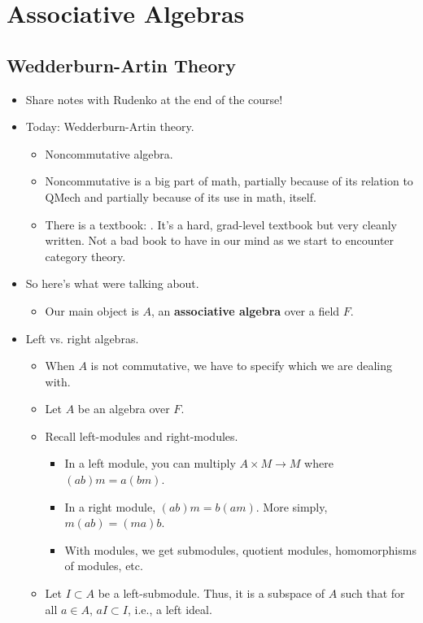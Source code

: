 \documentclass[../notes.tex]{subfiles}
\begin{document}
\chapter{Associative Algebras}
\section{Wedderburn-Artin Theory}
\begin{itemize}
    \item {}Share notes with Rudenko at the end of the course!
    \item Today: Wedderburn-Artin theory.
    \begin{itemize}
        \item Noncommutative algebra.
        \item Noncommutative is a big part of math, partially because of its relation to QMech and partially because of its use in math, itself.
        \item There is a textbook: \textcite{bib:Lang}. It's a hard, grad-level textbook but very cleanly written. Not a bad book to have in our mind as we start to encounter category theory.
    \end{itemize}
    \item So here's what were talking about.
    \begin{itemize}
        \item Our main object is $A$, an \textbf{associative algebra} over a field $F$.
    \end{itemize}
    \item Left vs. right algebras.
    \begin{itemize}
        \item When $A$ is not commutative, we have to specify which we are dealing with.
        \item Let $A$ be an algebra over $F$.
        \item Recall left-modules and right-modules.
        \begin{itemize}
            \item In a left module, you can multiply $A\times M\to M$ where $(ab)m=a(bm)$.
            \item In a right module, $(ab)m=b(am)$. More simply, $m(ab)=(ma)b$.
            \item With modules, we get submodules, quotient modules, homomorphisms of modules, etc.
        \end{itemize}
        \item Let $I\subset A$ be a left-submodule. Thus, it is a subspace of $A$ such that for all $a\in A$, $aI\subset I$, i.e., a left ideal.

\end{itemize}
\end{itemize}
\end{document}
